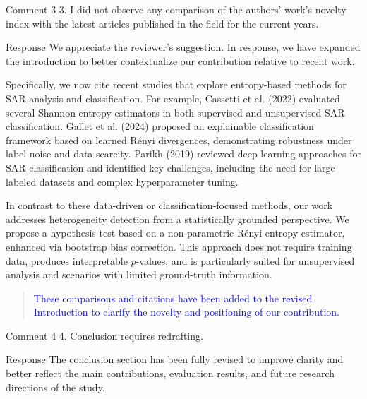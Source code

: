 \documentclass[11pt]{report}
\begin{document}
\vspace{10em}
\begin{reviewbox}{Comment 3}
 3. I did not observe any comparison of the authors' work's novelty index with the latest articles published in the field for the current years.
\end{reviewbox}

\begin{responsebox}{Response}
We appreciate the reviewer’s suggestion. In response, we have expanded the introduction to better contextualize our contribution relative to recent work.

Specifically, we now cite recent studies that explore entropy-based methods for SAR analysis and classification. For example, Cassetti et al. (2022) evaluated several Shannon entropy estimators in both supervised and unsupervised SAR classification. Gallet et al. (2024) proposed an explainable classification framework based on learned Rényi divergences, demonstrating robustness under label noise and data scarcity. Parikh (2019) reviewed deep learning approaches for SAR classification and identified key challenges, including the need for large labeled datasets and complex hyperparameter tuning.

In contrast to these data-driven or classification-focused methods, our work addresses heterogeneity detection from a statistically grounded perspective. We propose a hypothesis test based on a non-parametric Rényi entropy estimator, enhanced via bootstrap bias correction. This approach does not require training data, produces interpretable $p$-values, and is particularly suited for unsupervised analysis and scenarios with limited ground-truth information.

\begin{quote}
\textcolor{blue}{These comparisons and citations have been added to the revised Introduction to clarify the novelty and positioning of our contribution.}
\end{quote}
\end{responsebox}

\vspace{3em}
	
\begin{reviewbox}{Comment 4}
4. Conclusion requires redrafting.
\end{reviewbox}
\begin{responsebox}{Response}
The conclusion section has been fully revised to improve clarity and better reflect the main contributions, evaluation results, and future research directions of the study.

\end{responsebox}
\end{document}
